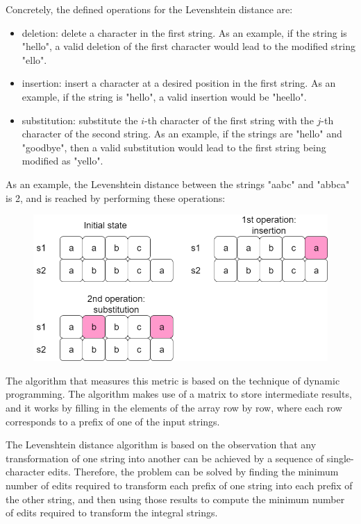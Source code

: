 \documentclass[letterpaper]{article}
\begin{document}
Concretely, the defined operations for the Levenshtein distance are:

\begin{itemize}
    \item deletion: delete a character in the first string. As an example, if the string is "hello", a valid deletion of the first character would lead to the modified string "ello".
    \item insertion: insert a character at a desired position in the first string. As an example, if the string is "hello", a valid insertion would be "heello".
    \item substitution: substitute the $i$-th character of the first string with the $j$-th character of the second string. As an example, if the strings are "hello" and "goodbye", then a valid substitution would lead to the first string being modified as "yello".
\end{itemize}

As an example, the Levenshtein distance between the strings "aabc" and "abbca" is 2, and is reached by performing these operations:

\begin{figure} [h!]
\centering
\includegraphics[width=1\textwidth]{pngOfDiagrams/levenshtein1.png}
\end{figure}

The algorithm that measures this metric is based on the technique of dynamic programming.  The algorithm makes use of a matrix to store intermediate results, and it works by filling in the elements of the array row by row, where each row corresponds to a prefix of one of the input strings.

The Levenshtein distance algorithm is based on the observation that any transformation of one string into another can be achieved by a sequence of single-character edits. Therefore, the problem can be solved by finding the minimum number of edits required to transform each prefix of one string into each prefix of the other string, and then using those results to compute the minimum number of edits required to transform the integral strings.
\end{document}
